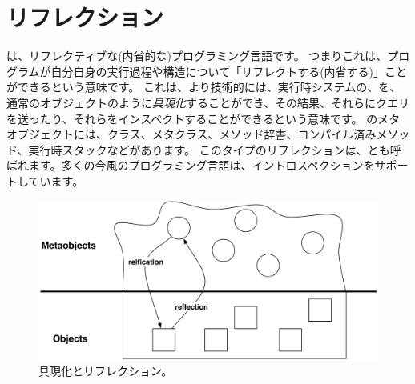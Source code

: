 \documentclass[a4paper,10pt,twoside]{book}
\begin{document}
	\renewcommand{\nnbb}[2]{} %
	\sloppy
\fi

\chapter{リフレクション}


\st{}は、リフレクティブな(内省的な)プログラミング言語です。
つまりこれは、プログラムが自分自身の実行過程や構造について「リフレクトする(内省する)」ことができるという意味です。
これは、より技術的には、実行時システムの、を、通常のオブジェクトのように\emph{具現化}することができ、その結果、それらにクエリを送ったり、それらをインスペクトすることができるという意味です。
\st{}のメタオブジェクトには、クラス、メタクラス、メソッド辞書、コンパイル済みメソッド、実行時スタックなどがあります。
このタイプのリフレクションは、とも呼ばれます。多くの今風のプログラミング言語は、イントロスペクションをサポートしています。

\begin{figure}[ht]\centering
	\includegraphics[width=\linewidth]{reflect}
	\caption{具現化とリフレクション。} %
\end{figure}
\end{document}
